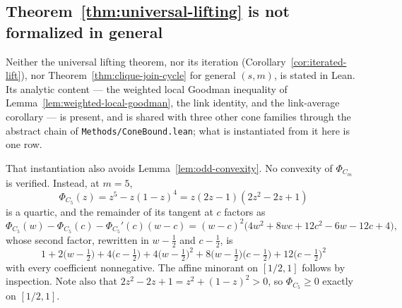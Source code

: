 \documentclass[11pt]{article}
\newcommand{\1}{\mathbf{1}}
\begin{document}
\subsection*{Theorem~\ref{thm:universal-lifting} is not formalized in general}

Neither the universal lifting theorem, nor its iteration
(Corollary~\ref{cor:iterated-lift}), nor Theorem~\ref{thm:clique-join-cycle}
for general $(s,m)$, is stated in Lean.  Its analytic content --- the weighted
local Goodman inequality of Lemma~\ref{lem:weighted-local-goodman}, the link
identity, and the link-average corollary --- is present, and is shared with
three other cone families through the abstract chain of
\texttt{Methods/ConeBound.lean}; what is instantiated from it here is one row.

That instantiation also avoids Lemma~\ref{lem:odd-convexity}.  No convexity of
$\Phi_{C_m}$ is verified.  Instead, at $m=5$,
\[
 \Phi_{C_5}(z)=z^5-z(1-z)^4=z(2z-1)(2z^2-2z+1)
\]
is a quartic, and the remainder of its tangent at $c$ factors as
\[
 \Phi_{C_5}(w)-\Phi_{C_5}(c)-\Phi_{C_5}'(c)(w-c)
 =(w-c)^2\bigl(4w^2+8wc+12c^2-6w-12c+4\bigr),
\]
whose second factor, rewritten in $w-\tfrac12$ and $c-\tfrac12$, is
\[
 1+2\bigl(w-\tfrac12\bigr)+4\bigl(c-\tfrac12\bigr)
 +4\bigl(w-\tfrac12\bigr)^2+8\bigl(w-\tfrac12\bigr)\bigl(c-\tfrac12\bigr)
 +12\bigl(c-\tfrac12\bigr)^2
\]
with every coefficient nonnegative.  The affine minorant on $[1/2,1]$ follows
by inspection.  Note also that $2z^2-2z+1=z^2+(1-z)^2>0$, so $\Phi_{C_5}\geq0$
exactly on $[1/2,1]$.
\end{document}
